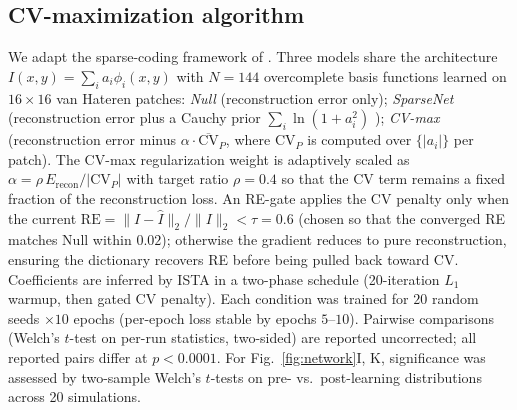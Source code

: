 \subsection{CV-maximization algorithm}
We adapt the sparse-coding framework of \cite{37}.  Three models share the architecture $I(x,y)=\sum_i a_i\phi_i(x,y)$ with $N=144$ overcomplete basis functions learned on $16\times 16$ van Hateren patches: \emph{Null} (reconstruction error only); \emph{SparseNet} (reconstruction error plus a Cauchy prior $\sum_i\ln(1+a_i^2)$ \cite{38}); \emph{CV-max} (reconstruction error minus $\alpha\cdot\overline{\mathrm{CV}}_P$, where $\mathrm{CV}_P$ is computed over $\{|a_i|\}$ per patch).  The CV-max regularization weight is adaptively scaled as $\alpha=\rho\,E_{\mathrm{recon}}/|\mathrm{CV}_P|$ with target ratio $\rho=0.4$ so that the CV term remains a fixed fraction of the reconstruction loss.  An RE-gate applies the CV penalty only when the current $\mathrm{RE}=\|I-\hat I\|_2/\|I\|_2<\tau=0.6$ (chosen so that the converged RE matches Null within $0.02$); otherwise the gradient reduces to pure reconstruction, ensuring the dictionary recovers RE before being pulled back toward CV.  Coefficients are inferred by ISTA in a two-phase schedule (20-iteration $L_1$ warmup, then gated CV penalty).  Each condition was trained for $20$ random seeds $\times 10$ epochs (per-epoch loss stable by epochs $5$--$10$).  Pairwise comparisons (Welch's $t$-test on per-run statistics, two-sided) are reported uncorrected; all reported pairs differ at $p<0.0001$.  For Fig.~\ref{fig:network}I, K, significance was assessed by two-sample Welch's $t$-tests on pre- vs.\ post-learning distributions across 20 simulations.
